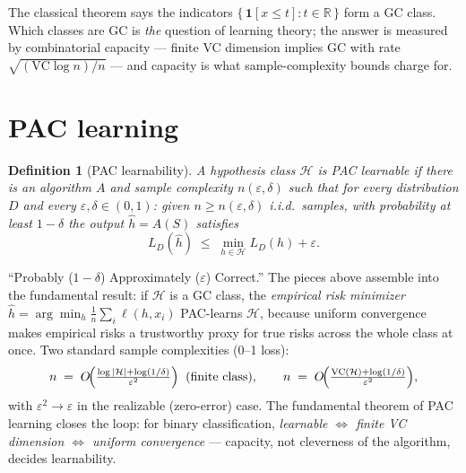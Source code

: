 \documentclass[11pt]{article}
\newtheorem{definition}{Definition}
\begin{document}
The classical theorem says the indicators
$\{\,\mathbf{1}[x\le t] : t\in\mathbb{R}\,\}$ form a GC class. Which
classes are GC is \emph{the} question of learning theory; the answer is
measured by combinatorial capacity --- finite VC dimension implies GC with
rate $\sqrt{(\text{VC}\log n)/n}$ --- and capacity is what
sample-complexity bounds charge for.

\section{PAC learning}

\begin{definition}[PAC learnability]
A hypothesis class $\mathcal{H}$ is PAC learnable if there is an algorithm
$A$ and sample complexity $n(\varepsilon,\delta)$ such that for every
distribution $D$ and every $\varepsilon, \delta \in (0,1)$: given
$n \ge n(\varepsilon,\delta)$ i.i.d.\ samples, with probability at least
$1-\delta$ the output $\hat h = A(S)$ satisfies
\begin{equation}
  L_D(\hat h) \;\le\; \min_{h\in\mathcal{H}} L_D(h) + \varepsilon .
  \label{eq:pac}
\end{equation}
\end{definition}

``Probably ($1-\delta$) Approximately ($\varepsilon$) Correct.'' The
pieces above assemble into the fundamental result: if $\mathcal{H}$ is a
GC class, the \emph{empirical risk minimizer}
$\hat h = \arg\min_{h} \tfrac1n\sum_i \ell(h, x_i)$ PAC-learns
$\mathcal{H}$, because uniform convergence makes empirical risks a
trustworthy proxy for true risks across the whole class at once. Two
standard sample complexities (0--1 loss):
\begin{equation}
  n \;=\; O\!\Bigl(\tfrac{\log|\mathcal{H}| + \log(1/\delta)}
  {\varepsilon^2}\Bigr)
  \;\;\text{(finite class)},
  \qquad
  n \;=\; O\!\Bigl(\tfrac{\mathrm{VC}(\mathcal{H}) + \log(1/\delta)}
  {\varepsilon^2}\Bigr),
  \label{eq:samplecomplexity}
\end{equation}
with $\varepsilon^2 \to \varepsilon$ in the realizable (zero-error) case.
The fundamental theorem of PAC learning closes the loop: for binary
classification, \emph{learnable $\iff$ finite VC dimension $\iff$ uniform
convergence} --- capacity, not cleverness of the algorithm, decides
learnability.
\end{document}
